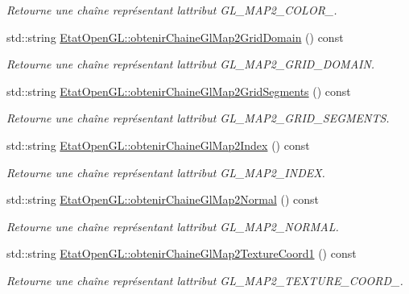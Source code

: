 \begin{DoxyCompactItemize}
\begin{DoxyCompactList}\small\item\em Retourne une chaîne représentant l\textquotesingle{}attribut G\+L\+\_\+\+M\+A\+P2\+\_\+\+C\+O\+L\+O\+R\+\_. \end{DoxyCompactList}\item 
std\+::string \hyperlink{group__utilitaire_ga15f308a3995cd63e0bf8ff13fd1024dd}{Etat\+Open\+G\+L\+::obtenir\+Chaine\+Gl\+Map2\+Grid\+Domain} () const 
\begin{DoxyCompactList}\small\item\em Retourne une chaîne représentant l\textquotesingle{}attribut G\+L\+\_\+\+M\+A\+P2\+\_\+\+G\+R\+I\+D\+\_\+\+D\+O\+M\+A\+I\+N. \end{DoxyCompactList}\item 
std\+::string \hyperlink{group__utilitaire_ga7cc72b6b6d1f670c6bb2a37bb02f22cc}{Etat\+Open\+G\+L\+::obtenir\+Chaine\+Gl\+Map2\+Grid\+Segments} () const 
\begin{DoxyCompactList}\small\item\em Retourne une chaîne représentant l\textquotesingle{}attribut G\+L\+\_\+\+M\+A\+P2\+\_\+\+G\+R\+I\+D\+\_\+\+S\+E\+G\+M\+E\+N\+T\+S. \end{DoxyCompactList}\item 
std\+::string \hyperlink{group__utilitaire_ga5c26c0fce87b7c852f2819ddbc816835}{Etat\+Open\+G\+L\+::obtenir\+Chaine\+Gl\+Map2\+Index} () const 
\begin{DoxyCompactList}\small\item\em Retourne une chaîne représentant l\textquotesingle{}attribut G\+L\+\_\+\+M\+A\+P2\+\_\+\+I\+N\+D\+E\+X. \end{DoxyCompactList}\item 
std\+::string \hyperlink{group__utilitaire_ga281e64b376bb0c3f7f7090820a64bd7e}{Etat\+Open\+G\+L\+::obtenir\+Chaine\+Gl\+Map2\+Normal} () const 
\begin{DoxyCompactList}\small\item\em Retourne une chaîne représentant l\textquotesingle{}attribut G\+L\+\_\+\+M\+A\+P2\+\_\+\+N\+O\+R\+M\+A\+L. \end{DoxyCompactList}\item 
std\+::string \hyperlink{group__utilitaire_gadb7c67ea193286a4088b9dcc172abef6}{Etat\+Open\+G\+L\+::obtenir\+Chaine\+Gl\+Map2\+Texture\+Coord1} () const 
\begin{DoxyCompactList}\small\item\em Retourne une chaîne représentant l\textquotesingle{}attribut G\+L\+\_\+\+M\+A\+P2\+\_\+\+T\+E\+X\+T\+U\+R\+E\+\_\+\+C\+O\+O\+R\+D\+\_. \end{DoxyCompactList}\item 

\end{DoxyCompactItemize}
